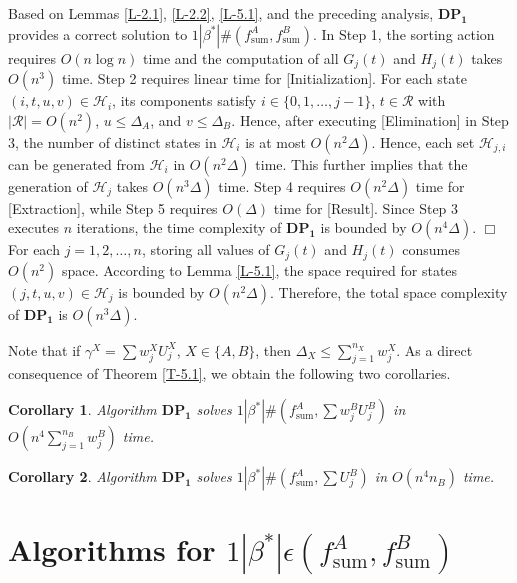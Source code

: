 \documentclass[12pt]{article}
\newtheorem{cor}{Corollary}[section]
\begin{document}
\begin{sloppypar}
 Based on Lemmas \ref{L-2.1}, \ref{L-2.2}, \ref{L-5.1}, and the preceding analysis, $\mathbf{DP_1}$ provides a correct solution to $1 | \beta^{*}|\#(f_{\mathrm{sum}}^A, f_{\mathrm{sum}}^B)$. In Step 1, the sorting action requires $O(n \log n)$ time and the computation of all $G_j(t)$ and $H_j(t)$ takes $O(n^3)$ time. Step 2 requires linear time for [Initialization]. For each state $(i, t, u, v) \in \mathcal{H}_i$, its components satisfy $i \in \{0, 1, \ldots, j-1\}$, $t \in \mathcal{R}$ with $|\mathcal{R}|=O(n^2)$, $u \leq \Delta_A$, and $v \leq \Delta_B$. Hence, after executing [Elimination] in Step 3, the number of distinct states in $\mathcal{H}_i$ is at most $O(n^2 \Delta)$. Hence, each set $\mathcal{H}_{j,i}$ can be generated from $\mathcal{H}_i$ in $O(n^2 \Delta)$ time. This further implies that the generation of $\mathcal{H}_j$ takes $O(n^3 \Delta)$ time. Step 4 requires $O(n^2 \Delta)$ time for [Extraction], while Step 5 requires $O(\Delta)$ time for [Result]. Since Step 3 executes $n$ iterations, the time complexity of $\mathbf{DP_1}$ is bounded by $O(n^4 \Delta)$.  \hfill$\Box$\\

For each $j=1, 2, \ldots, n$, storing all values of $G_j(t)$ and $H_j(t)$ consumes $O(n^2)$ space. According to Lemma \ref{L-5.1}, the space required for states $(j, t, u, v) \in \mathcal{H}_j$ is bounded by $O(n^2 \Delta)$. Therefore, the total space complexity of $\mathbf{DP_1}$ is $O(n^3 \Delta)$.

Note that if $\gamma^X=\sum w_j^X U_j^X$, $X \in \{A, B\}$, then $\Delta_X \leq \sum_{j=1}^{n_X} w_j^X$. As a direct consequence of Theorem \ref{T-5.1}, we obtain the following two corollaries. 

\begin{cor} \label{C-5.1}
Algorithm $\mathbf{DP_1}$ solves $1 | \beta^{*}|\#(f_{\mathrm{sum}}^A, \sum w_j^B U_j^B)$ in $O(n^4 \sum_{j=1}^{n_B} w_j^B)$ time.
\end{cor}

\begin{cor} \label{C-5.2}
Algorithm $\mathbf{DP_1}$ solves $1 | \beta^{*}|\#(f_{\mathrm{sum}}^A, \sum U_j^B)$ in $O(n^4 n_B)$ time.
\end{cor}

\section{Algorithms for $1 | \beta^{*}|\epsilon(f_{\mathrm{sum}}^A, f_{\mathrm{sum}}^B)$}


\end{sloppypar}
\end{document}
